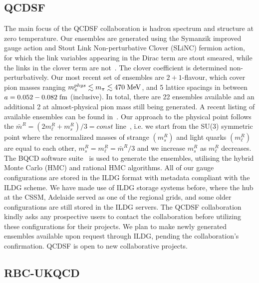 \documentclass[a4paper,11pt]{article}
\begin{document}
\subsection{QCDSF}
The main focus of the QCDSF collaboration is hadron spectrum and
structure at zero temperature.
%
%
Our ensembles are generated using the Symanzik improved gauge action
and Stout Link Non-perturbative Clover (SLiNC) fermion action, for
which the link variables appearing in the Dirac term are stout
smeared, while the links in the clover term are
not~\cite{Cundy:2009yy}. The clover coefficient is determined
non-perturbatively.
%
Our most recent set of ensembles are $2+1$-flavour, which cover pion
masses ranging $m_\pi^{phys} \lesssim m_\pi \lesssim 470 \; {\rm
  MeV}$, and 5 lattice spacings in between $a = 0.052 - 0.082 \; {\rm
  fm}$ (inclusive).
%
In total, there are 22 ensembles available and an additional 2 at
almost-physical pion mass still being generated. A recent listing of
available ensembles can be found in~\cite{QCDSFUKQCDCSSM:2023qlx}.
%
Our approach to the physical point follows the $\bar m^R = (2m_\ell^R
+ m_s^R)/3 = const$ line~\cite{Bietenholz:2011qq}, i.e. we start from
the SU(3) symmetric point where the renormalized masses of strange
$(m_s^R)$ and light quarks $(m_\ell^R)$ are equal to each other,
$m_s^R = m_\ell^R = \bar m^R/3$ and we increase $m_s^R$ as $m_\ell^R$
decreases.
%
%
The BQCD software suite~\cite{Haar:2017ubh} is used to generate the
ensembles, utilising the hybrid Monte Carlo (HMC) and rational HMC
algorithms.
%
%
All of our gauge configurations are stored in the ILDG format with
metadata compliant with the ILDG scheme. We have made use of ILDG
storage systems before, where the hub at the CSSM, Adelaide served as
one of the regional grids, and some older configurations are still
stored in the ILDG servers.
%
%
The QCDSF collaboration kindly asks any prospective users to contact
the collaboration before utilizing these configurations for their
projects. We plan to make newly generated ensembles available upon
request through ILDG, pending the collaboration's confirmation. QCDSF
is open to new collaborative projects.


\subsection{RBC-UKQCD}
\end{document}
